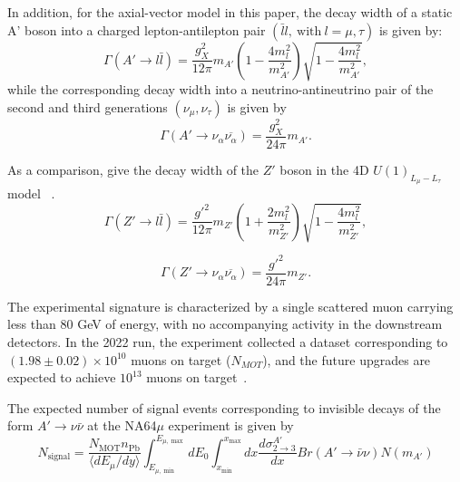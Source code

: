 \documentclass[onecolumn, aps, nofootinbib, prd, preprint, floats, floatfix, amsmath, amssymb, superscriptaddress, preprintnumbers]{revtex4-1}
\begin{document}
In addition, for the axial-vector model in this paper, the decay width of a static A' boson into a charged lepton-antilepton pair $(\bar{l}l,\ \text{with}\ l=\mu,\tau)$ is given by:
\begin{equation}
    \Gamma(A' \to l\bar{l}) = \frac{g_X^2}{12\pi} m_{A'} \left( 1 - \frac{4m_l^2}{m_{A'}^2} \right) \sqrt{1 - \frac{4m_l^2}{m_{A'}^2}},
\end{equation}
while the corresponding decay width into a neutrino-antineutrino pair of the second and third generations $(\nu_\mu,\nu_\tau)$ is given by
\begin{equation}
    \Gamma(A' \to \nu_\alpha\overline{\nu_\alpha}) = \frac{g_X^2}{24\pi} m_{A'}.
\end{equation}

As a comparison, give the decay width of the $Z'$ boson in the 4D $U(1)_{L_\mu - L_\tau}$ model ~\cite{chakraborty2025muon}.
\begin{equation}
    \Gamma(Z' \to l\bar{l}) = \frac{g'^2}{12\pi} m_{Z'} \left( 1 + \frac{2m_l^2}{m_{Z'}^2} \right) \sqrt{1 - \frac{4m_l^2}{m_{Z'}^2}},
\end{equation}

\begin{equation}
    \Gamma(Z' \to \nu_\alpha\overline{\nu_\alpha}) = \frac{g'^2}{24\pi} m_{Z'}.
\end{equation}

The experimental signature is characterized by a single scattered muon carrying less than 80 GeV of energy, with no accompanying activity in the downstream detectors. In the 2022 run, the experiment collected a dataset corresponding to $(1.98 \pm 0.02) \times 10^{10}$ muons on target ($N_{MOT}$), and the future upgrades are expected to achieve $10^{13}$ muons on target~\cite{andreev2024exploration}.

The expected number of signal events corresponding to invisible decays of the form $A' \to \nu\bar{\nu}$ at the NA64$\mu$  experiment is given by
\begin{equation}
N_{\text{signal}} = \frac{N_{\text{MOT}} n_{\text{Pb}}}{\langle dE_\mu/dy \rangle} \int_{E_{\mu,\min}}^{E_{\mu,\max}} dE_0 \int_{x_{\min}}^{x_{\max}} dx \frac{d\sigma_{2\to3}^{A'}}{dx} Br(A' \to \bar{\nu}\nu) N(m_{A'})
\label{eq:NA64Signal}
\end{equation}
\end{document}
